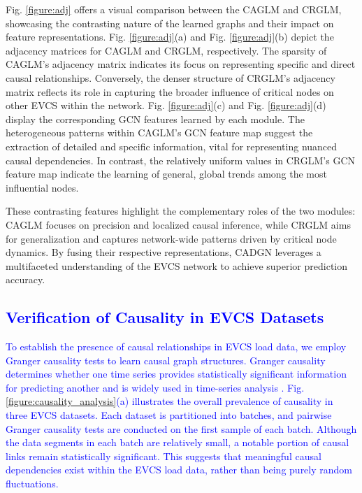\documentclass[lettersize,journal]{IEEEtran}
\newcommand{\hl}[1]{\textcolor{blue}{#1}}
\begin{document}
Fig. \ref{figure:adj} offers a visual comparison between the CAGLM and CRGLM, showcasing the contrasting nature of the learned graphs and their impact on feature representations. Fig. \ref{figure:adj}(a) and Fig. \ref{figure:adj}(b) depict the adjacency matrices for CAGLM and CRGLM, respectively. The sparsity of CAGLM’s adjacency matrix indicates its focus on representing specific and direct causal relationships. Conversely, the denser structure of CRGLM’s adjacency matrix reflects its role in capturing the broader influence of critical nodes on other EVCS within the network. Fig. \ref{figure:adj}(c) and Fig. \ref{figure:adj}(d) display the corresponding GCN features learned by each module. The heterogeneous patterns within CAGLM’s GCN feature map suggest the extraction of detailed and specific information, vital for representing nuanced causal dependencies. In contrast, the relatively uniform values in CRGLM's GCN feature map indicate the learning of general, global trends among the most influential nodes.

These contrasting features highlight the complementary roles of the two modules: CAGLM focuses on precision and localized causal inference, while CRGLM aims for generalization and captures network-wide patterns driven by critical node dynamics. By fusing their respective representations, CADGN leverages a multifaceted understanding of the EVCS network to achieve superior prediction accuracy.


\subsection{\hl{Verification of Causality in EVCS Datasets}}
 
\hl{To establish the presence of causal relationships in EVCS load data, we employ Granger causality tests \cite{granger1969investigating} to learn causal graph structures. Granger causality determines whether one time series provides statistically significant information for predicting another and is widely used in time-series analysis \cite{shojaie2022granger}. Fig. \ref{figure:causality_analysis}(a) illustrates the overall prevalence of causality in three EVCS datasets. Each dataset is partitioned into batches, and pairwise Granger causality tests are conducted on the first sample of each batch. Although the data segments in each batch are relatively small, a notable portion of causal links remain statistically significant. This suggests that meaningful causal dependencies exist within the EVCS load data, rather than being purely random fluctuations.}
\end{document}
